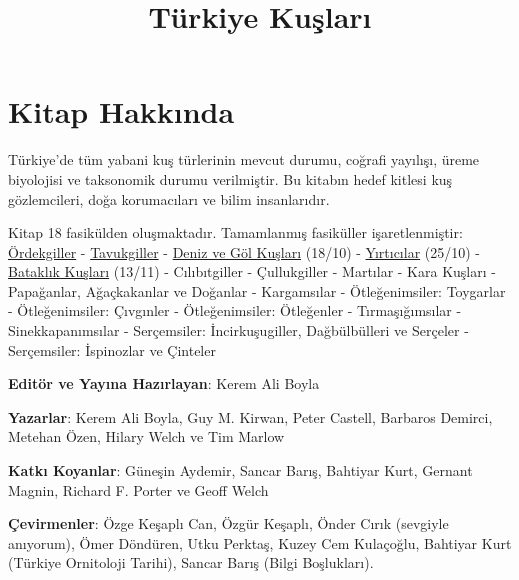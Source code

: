 \documentclass[
  a4paper,
  DIV=11,
  numbers=noendperiod]{scrreprt}
\title{Türkiye Kuşları}
\author{}
\date{}
\renewcommand*\contentsname{Table of contents}
\newcommand\contentsname{Table of contents}
\begin{document}
\maketitle

\renewcommand*\contentsname{Table of contents}
{
\hypersetup{linkcolor=}
\setcounter{tocdepth}{2}
\tableofcontents
}


\chapter*{Kitap Hakkında}\label{kitap-hakkux131nda}


Türkiye'de tüm yabani kuş türlerinin mevcut durumu, coğrafi yayılışı,
üreme biyolojisi ve taksonomik durumu verilmiştir. Bu kitabın hedef
kitlesi kuş gözlemcileri, doğa korumacıları ve bilim insanlarıdır.

Kitap 18 fasikülden oluşmaktadır. Tamamlanmış fasiküller
işaretlenmiştir:
\href{https://keremaliboyla.github.io/turkiye-kuslari/01_ordekgiller.html}{Ördekgiller}
-
\href{https://keremaliboyla.github.io/turkiye-kuslari/02_tavukgiller.html}{Tavukgiller}
-
\href{https://keremaliboyla.github.io/turkiye-kuslari/03_deniz-ve-gol-kuslari.html}{Deniz
ve Göl Kuşları} (18/10) -
\href{https://keremaliboyla.github.io/turkiye-kuslari/04_yirticilar.html}{Yırtıcılar}
(25/10) -
\href{https://keremaliboyla.github.io/turkiye-kuslari/05_bataklik-kuslari.html}{Bataklık
Kuşları} (13/11) - Cılıbıtgiller - Çullukgiller - Martılar - Kara
Kuşları - Papağanlar, Ağaçkakanlar ve Doğanlar - Kargamsılar -
Ötleğenimsiler: Toygarlar - Ötleğenimsiler: Çıvgınler - Ötleğenimsiler:
Ötleğenler - Tırmaşığımsılar - Sinekkapanımsılar - Serçemsiler:
İncirkuşugiller, Dağbülbülleri ve Serçeler - Serçemsiler: İspinozlar ve
Çinteler

\textbf{Editör ve Yayına Hazırlayan}: Kerem Ali Boyla

\textbf{Yazarlar}: Kerem Ali Boyla, Guy M. Kirwan, Peter Castell,
Barbaros Demirci, Metehan Özen, Hilary Welch ve Tim Marlow

\textbf{Katkı Koyanlar}: Güneşin Aydemir, Sancar Barış, Bahtiyar Kurt,
Gernant Magnin, Richard F. Porter ve Geoff Welch

\textbf{Çevirmenler}: Özge Keşaplı Can, Özgür Keşaplı, Önder Cırık
(sevgiyle anıyorum), Ömer Döndüren, Utku Perktaş, Kuzey Cem Kulaçoğlu,
Bahtiyar Kurt (Türkiye Ornitoloji Tarihi), Sancar Barış (Bilgi
Boşlukları).
\end{document}
